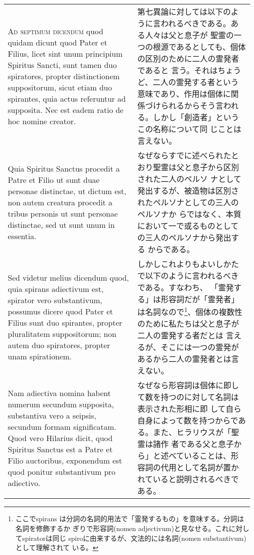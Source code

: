 \documentclass[10pt]{jsarticle} %
\begin{document}
\begin{longtable}{p{21em}p{21em}}
\\



{\scshape Ad septimum dicendum} quod quidam dicunt quod Pater et Filius, licet
sint unum principium  Spiritus Sancti, sunt tamen duo spiratores,
propter distinctionem suppositorum, sicut etiam duo spirantes, quia
actus referuntur ad supposita. Nec est eadem ratio de hoc nomine
creator. 

&

第七異論に対しては以下のように言われるべきである。ある人々は父と息子が
聖霊の一つの根源であるとしても、個体の区別のために二人の霊発者であると
言う。それはちょうど、二人の霊発する者という意味であり、作用は個体に関
係づけられるからそう言われる。しかし「創造者」というこの名称について同
じことは言えない。

\\

Quia Spiritus Sanctus procedit a Patre et Filio
ut sunt duae personae distinctae, ut dictum est, non autem creatura
procedit a tribus personis ut sunt personae distinctae, sed ut sunt
unum in essentia. 


&

なぜならすでに述べられたとおり聖霊は父と息子から区別された二人のペルソ
ナとして発出するが、被造物は区別されたペルソナとしての三人のペルソナか
らではなく、本質において一で或るものとしての三人のペルソナから発出する
からである。

\\


Sed videtur melius dicendum quod, quia spirans
adiectivum est, spirator vero substantivum, possumus dicere quod Pater
et Filius sunt duo spirantes, propter pluralitatem suppositorum; non
autem duo spiratores, propter unam spirationem. 


&

しかしこれよりもよいしかたで以下のように言われるべきである。すなわち、
「霊発する」は形容詞だが「霊発者」は名詞なので\footnote{ここでspirans
は分詞の名詞的用法で「霊発するもの」を意味する。分詞は名詞を修飾するか
ぎりで形容詞(nomen adjectivum)と見なせる。これに対してspiratorは同じ
spiroに由来するが、文法的には名詞(nomen substantivum)として理解されて
いる。}、個体の複数性のために私たちは父と息子が二人の霊発する者だとは
言えるが、そこには一つの霊発があるから二人の霊発者とは言えない。

\\


Nam adiectiva nomina
habent numerum secundum supposita, substantiva vero a seipsis,
secundum formam significatam. Quod vero Hilarius dicit, quod 
Spiritus Sanctus est a Patre et Filio auctoribus, exponendum est quod
ponitur substantivum pro adiectivo.

&

なぜなら形容詞は個体に即して数を持つのに対して名詞は表示された形相に即
して自ら自身によって数を持つからである。また、ヒラリウスが「聖霊は諸作
者である父と息子から」と述べていることは、形容詞の代用として名詞が置か
 れていると説明されるべきである。


\end{longtable}
\end{document}
